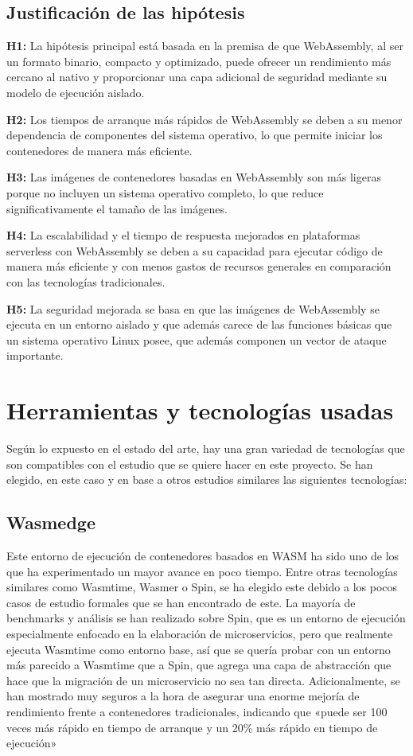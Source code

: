 \subsection{Justificación de las hipótesis}

\textbf{H1:} La hipótesis principal está basada en la premisa de que WebAssembly, al ser un formato binario, compacto y optimizado, puede ofrecer un rendimiento más cercano al nativo y proporcionar una capa adicional de seguridad mediante su modelo de ejecución aislado.

\textbf{H2:} Los tiempos de arranque más rápidos de WebAssembly se deben a su menor dependencia de componentes del sistema operativo, lo que permite iniciar los contenedores de manera más eficiente.

\textbf{H3:} Las imágenes de contenedores basadas en WebAssembly son más ligeras porque no incluyen un sistema operativo completo, lo que reduce significativamente el tamaño de las imágenes.

\textbf{H4:} La escalabilidad y el tiempo de respuesta mejorados en plataformas serverless con WebAssembly se deben a su capacidad para ejecutar código de manera más eficiente y con menos gastos de recursos generales en comparación con las tecnologías tradicionales.

\textbf{H5:} La seguridad mejorada se basa en que las imágenes de WebAssembly se ejecuta en un entorno aislado y que además carece de las funciones básicas que un sistema operativo Linux posee, que además componen un vector de ataque importante.

\section{Herramientas y tecnologías usadas}

Según lo expuesto en el estado del arte, hay una gran variedad de tecnologías que son compatibles con el estudio que se quiere hacer en este proyecto. Se han elegido, en este caso y en base a otros estudios similares las siguientes tecnologías:

\subsection{Wasmedge}

Este entorno de ejecución de contenedores basados en WASM ha sido uno de los que ha experimentado un mayor avance en poco tiempo. Entre otras tecnologías similares como Wasmtime, Wasmer o Spin, se ha elegido este debido a los pocos casos de estudio formales que se han encontrado de este. La mayoría de benchmarks y análisis se han realizado sobre Spin, que es un entorno de ejecución especialmente enfocado en la elaboración de microservicios, pero que realmente ejecuta Wasmtime como entorno base, así que se quería probar con un entorno más parecido a Wasmtime que a Spin, que agrega una capa de abstracción que hace que la migración de un microservicio no sea tan directa. Adicionalmente, se han mostrado muy seguros a la hora de asegurar una enorme mejoría de rendimiento frente a contenedores tradicionales, indicando que «puede ser 100 veces más rápido en tiempo de arranque y un 20\% más rápido en tiempo de ejecución»

